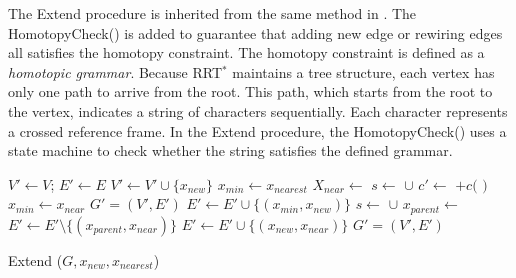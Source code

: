 \documentclass[letterpaper, 10 pt, conference]{ieeeconf}
\begin{document}
The {\sc Extend} procedure is inherited from the same method in \cite{Karaman-RSS-10}.
The {\sc HomotopyCheck}() is added to guarantee that adding new edge or rewiring edges all satisfies the homotopy constraint.
The homotopy constraint is defined as a \emph{homotopic grammar}.
Because RRT$^{*}$ maintains a tree structure, each vertex has only one path to arrive from the root.
This path, which starts from the root to the vertex, indicates a string of characters sequentially.
Each character represents a crossed reference frame.
In the {\sc Extend} procedure, the {\sc HomotopyCheck}() uses a state machine to check whether the string satisfies the defined grammar.

\begin{algorithm}
	\begin{algorithmic}[1]
		\State $ V' \leftarrow V $; $ E' \leftarrow E $
		\State $ V' \leftarrow V' \cup \{ x_{new} \} $
		\State $ x_{min} \leftarrow x_{nearest} $
		\State $ X_{near} \leftarrow $ 
		\State $ s \leftarrow $  $ \cup $ 
					\State $ c' \leftarrow $  $ + c( $  $ ) $ 
						\State $ x_{min} \leftarrow x_{near} $
					\EndIf
				\EndIf
			\EndFor
		\Else
		    \State \Return $ G' = (V', E') $ 		
		\EndIf
		\State $ E' \leftarrow E' \cup \{ ( x_{min}, x_{new} ) \} $
			    \State $ s \leftarrow $  $ \cup $ 
					\State $ x_{parent} \leftarrow $ 
					\State $ E' \leftarrow E' \setminus \{ ( x_{parent}, x_{near} ) \} $
					\State $ E' \leftarrow E' \cup \{ ( x_{new}, x_{near} ) \} $
				\EndIf
			\EndIf
		\EndFor
		\Return $ G' = (V', E') $ 
	\end{algorithmic}
\label{alg:harrt:extend}
\caption{ {\sc Extend } ($ G, x_{new}, x_{nearest} $) }
\end{algorithm}
\end{document}
